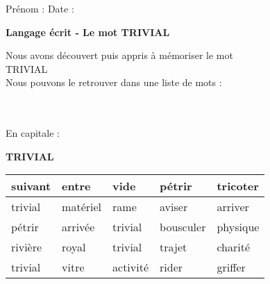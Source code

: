 \documentclass[a4paper, 11pt,oneside, fleqn]{article}
\begin{document}
\newcommand{\x}{\times}
\renewcommand{\arraystretch}{1.5}

\sloppy
\pagestyle{empty}
\begin{onehalfspace}


\sffamily \noindent \Large Pr\'enom : \fbox{\begin{minipage}{9cm} \vspace{1.2cm}\hspace{9cm} \end{minipage}} \hspace{1.5cm}\Large Date :\vspace{2mm}\\
\begin{minipage}{12cm}
\begin{center}
\Large\textbf{Langage \'ecrit - Le mot \MakeUppercase{trivial}}
\end{center}
\normalsize Nous avons d\'ecouvert puis appris \`a m\'emoriser le mot\\
\MakeUppercase{trivial}\\
Nous pouvons le retrouver dans une liste de mots : \end{minipage}\\
\vspace{0.25cm}\\
 
\large\noindent En capitale :
\begin{center}
{\huge \textbf{\MakeUppercase{trivial}}}
\vspace{0.25cm}\\
\begin{tabulary}{17cm}{|g|g|g|g|g|}
\hline
suivant & entre & vide & pétrir & tricoter \\
\hline
trivial & matériel & rame & aviser & arriver \\
\hline
pétrir & arrivée & trivial & bousculer & physique \\
\hline
rivière & royal & trivial & trajet & charité \\
\hline
trivial & vitre & activité & rider & griffer \\
\hline
\end{tabulary}
\end{center}
\vspace{0.5cm}


\end{onehalfspace}
\end{document}

